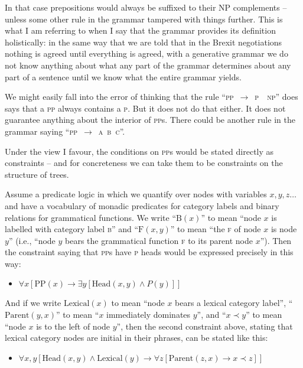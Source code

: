 \documentclass[output=paper]{langscibook}
\begin{document}
In that case prepositions would always be suffixed to their NP complements -- unless some other rule in the grammar tampered with things further. This is what I am referring to when I say that the grammar provides its definition holistically: in the same way that we are told that in the Brexit negotiations nothing is agreed until everything is agreed, with a generative grammar we do not know anything about what any part of the grammar determines about any part of a sentence until we know what the entire grammar yields.

We might easily fall into the error of thinking that the rule ``\textsc{pp}~$\rightarrow$~\textsc{p}~~\textsc{np}'' does says that a \textsc{pp} always contains a \textsc{p}.  But it does not do that either. It does not guarantee anything about the interior of \textsc{pp}s. There could be another rule in the grammar saying ``\textsc{pp}~$\rightarrow$~\textsc{a}~\textsc{b}~\textsc{c}''.

Under the view I favour, the conditions on \textsc{pp}s would be stated directly as constraints -- and for concreteness we can take them to be constraints on the structure of trees.

Assume a predicate logic in which we quantify over nodes with variables $x, y, z\ldots$ and have a vocabulary of monadic predicates for category labels and binary relations for grammatical functions.  We write ``$\text{B}(x)$'' to mean ``node $x$ is labelled with category label \textsc{b}'' and ``$\text{F}(x,y)$'' to mean ``the \textsc{f} of node $x$ is node $y$'' (i.e., ``node $y$ bears the grammatical function \textsc{f} to its parent node $x$''). Then the constraint saying that \textsc{pp}s have \textsc{p} heads would be expressed precisely in this way:

\begin{itemize} 
\item[] $\forall x [ \text{PP}(x) \rightarrow                \exists y [ \text{Head}(x,y) \wedge P(y) ] ]$ 
\end{itemize} 

And if we write $\text{Lexical}(x)$ to mean ``node $x$ bears a lexical category label'', ``$\text{Parent}(y,x)$'' to mean ``$x$ immediately dominates $y$'', and ``$x \prec y$'' to mean ``node $x$ is to the left of node $y$'', then the second constraint above, stating that lexical category nodes are initial in their phrases, can be stated like this:

\begin{itemize} 
\item[] $\forall x, y [ \text{Head}(x,y) \wedge \text{Lexical}(y) \rightarrow \forall z [ \text{Parent}(z,x) \rightarrow x \prec z ] ]$ 
\end{itemize}
\end{document}

